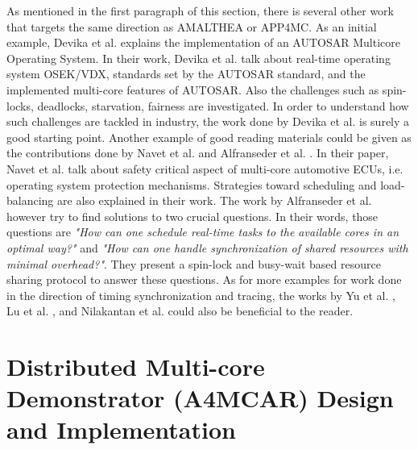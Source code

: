 As mentioned in the first paragraph of this section, there is several other work that targets the same direction as AMALTHEA or APP4MC. As an initial example, Devika et al. \cite{autosarospaper1} explains the implementation of an AUTOSAR Multicore Operating System. In their work, Devika et al. talk about real-time operating system OSEK/VDX, standards set by the AUTOSAR standard, and the implemented multi-core features of AUTOSAR. Also the challenges such as spin-locks, deadlocks, starvation, fairness are investigated. In order to understand how such challenges are tackled in industry, the work done by Devika et al. is surely a good starting point. Another example of good reading materials could be given as the contributions done by Navet et al. \cite{paper2} and Alfranseder et al. \cite{paper3}. In their paper, Navet et al. talk about safety critical aspect of multi-core automotive ECUs, i.e. operating system protection mechanisms. Strategies toward scheduling and load-balancing are also explained in their work. The work by Alfranseder et al. \cite{paper3} however try to find solutions to two crucial questions. In their words, those questions are \textit{"How can one schedule real-time tasks to the available cores in an optimal way?"} and \textit{"How can one handle synchronization of shared resources with minimal overhead?"}. They present a spin-lock and busy-wait based resource sharing protocol to answer these questions. As for more examples for work done in the direction of timing synchronization and tracing, the works by Yu et al. \cite{paper4}, Lu et al. \cite{paper5}, and Nilakantan et al. \cite{paper6} could also be beneficial to the reader.

\chapter{Distributed Multi-core Demonstrator (A4MCAR) Design and Implementation} \label{designchapter}

